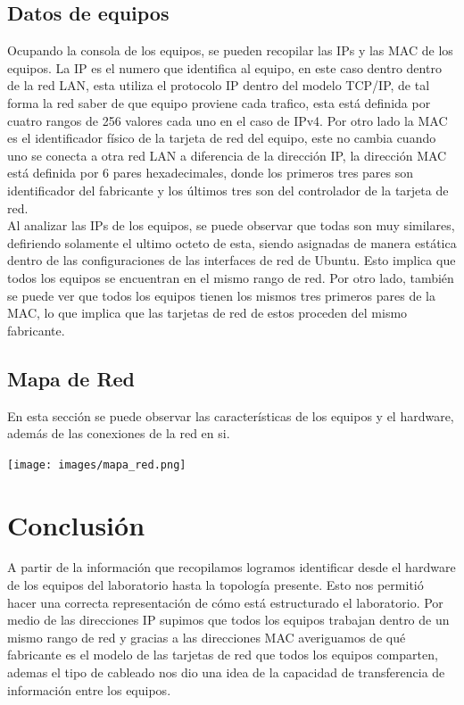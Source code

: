 \documentclass[spanish]{udpreport}
\begin{document}
\section{Datos de equipos}
Ocupando la consola de los equipos, se pueden recopilar las IPs y las MAC de los equipos. La IP es el numero que identifica al equipo, en este caso dentro dentro de la red LAN, esta utiliza el protocolo IP dentro del modelo TCP/IP, de tal forma la red saber de que equipo proviene cada trafico, esta está definida por cuatro rangos de 256 valores cada uno en el caso de IPv4. Por otro lado la MAC es el identificador físico de la tarjeta de red del equipo, este no cambia cuando uno se conecta a otra red LAN a diferencia de la dirección IP, la dirección MAC está definida por 6 pares hexadecimales, donde los primeros tres pares son identificador del fabricante y los últimos tres son del controlador de la tarjeta de red.
\\

\setlength{\parindent}{0.5cm} Al analizar las IPs de los equipos, se puede observar que todas son muy similares, defiriendo solamente el ultimo octeto de esta, siendo asignadas de manera estática dentro de las configuraciones de las interfaces de red de Ubuntu. Esto implica que todos los equipos se encuentran en el mismo rango de red. Por otro lado, también se puede ver que todos los equipos tienen los mismos tres primeros pares de la MAC, lo que implica que las tarjetas de red de estos proceden del mismo fabricante.



\pagebreak
\section{Mapa de Red}
En esta sección se puede observar las características de los equipos y el hardware, además de las conexiones de la red en si. 
\begin{center}
	\texttt{[image: images/mapa\_red.png]} 
\end{center}

\listoffigures

\chapter{Conclusión}

A partir de la información que recopilamos logramos identificar desde el hardware de los equipos del laboratorio hasta la topología presente. Esto nos permitió hacer una correcta representación de cómo está estructurado el laboratorio. Por medio de las direcciones IP  supimos que todos los equipos trabajan dentro de un mismo rango de red y gracias a las direcciones MAC averiguamos de qué fabricante es el modelo de las tarjetas de red que todos los equipos comparten, ademas el tipo de cableado nos dio una idea de la capacidad de transferencia de información entre los equipos. 
\end{document}
